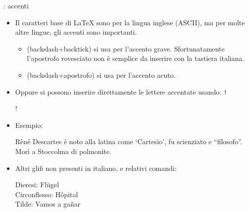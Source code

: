 \documentclass{beamer}
\begin{document}
\begin{frame}[fragile]{\insertsubsection{}: accenti}
\small
\begin{itemize}
\item Il caratteri base di \LaTeX{} sono per la lingua inglese (ASCII), ma per molte altre lingue, gli accenti sono importanti.
\begin{itemize}
\item {} (backslash+backtick) si usa per l'accento grave. Sfortunatamente l'apostrofo rovesciato non \`e semplice da inserire con la tastiera italiana.
\item {} (backslash+apostrofo) si usa per l'accento acuto.
\end{itemize}
\item Oppure si possono inserire direttamente le lettere accentate usando:
\texttt!\usepackage[utf8]{inputenc}!
\item Esempio:
\begin{exampletwouptiny}
R\`{e}n\'{e} Descartes \'{e} noto
alla latina come `Cartesio', 
fu scienziato e ``filosofo''.
Mor\`{i} a Stoccolma di polmonite.
\end{exampletwouptiny}

\item Altri glifi non presenti in italiano, e relativi comandi:
\begin{exampletwouptiny}
Dieresi: Fl\"ugel\\
Circonflesso: H\^opital\\
Tilde: Vamos a ga\~nar\\
\end{exampletwouptiny}
\end{itemize}
\end{frame}
\end{document}
